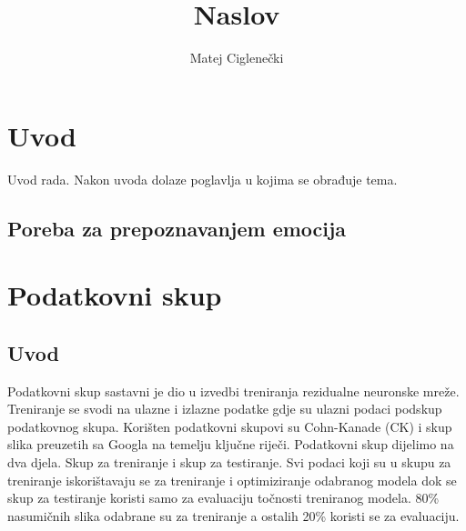 \documentclass[times, utf8, zavrsni,numeric]{fer}
\begin{document}

\title{Naslov}

\author{Matej Ciglenečki}

\maketitle

\izvornik

\zahvala{}

\tableofcontents

\chapter{Uvod}
Uvod rada. Nakon uvoda dolaze poglavlja u kojima se obrađuje tema.
\section{Poreba za prepoznavanjem emocija}

%



\chapter{Podatkovni skup}
\section{Uvod}
Podatkovni skup sastavni je dio u izvedbi treniranja rezidualne neuronske mreže. Treniranje se svodi na ulazne i izlazne podatke gdje su ulazni podaci podskup podatkovnog skupa. Korišten podatkovni skupovi su Cohn-Kanade (CK) i skup slika preuzetih sa Googla na temelju ključne riječi. Podatkovni skup dijelimo na dva djela. Skup za treniranje i skup za testiranje. Svi podaci koji su u skupu za treniranje iskorištavaju se za treniranje i optimiziranje odabranog modela dok se skup za testiranje koristi samo za evaluaciju točnosti treniranog modela. 80\% nasumičnih slika odabrane su za treniranje a ostalih 20\% koristi se za evaluaciju.
\end{document}
